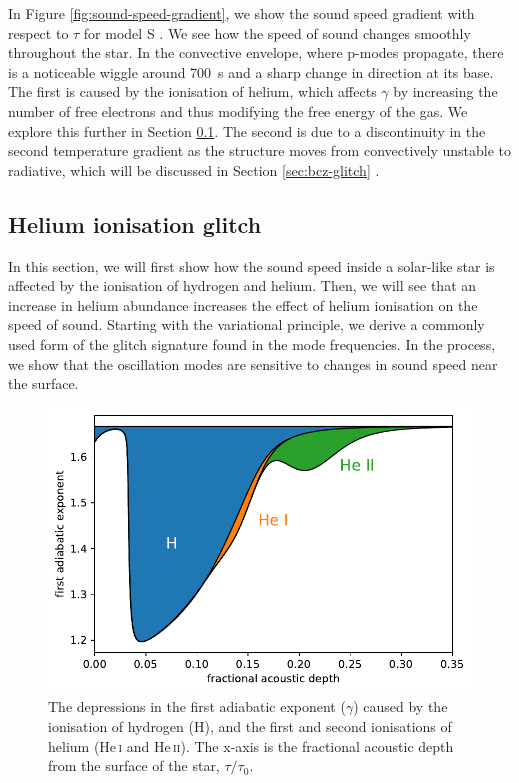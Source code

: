 In Figure \ref{fig:sound-speed-gradient}, we show the sound speed gradient with respect to \(\tau\) for model S . We see how the speed of sound changes smoothly throughout the star. In the convective envelope, where p-modes propagate, there is a noticeable wiggle around \SI{700}{\second} and a sharp change in direction at its base. The first is caused by the ionisation of helium, which affects \(\gamma\) by increasing the number of free electrons and thus modifying the free energy of the gas. We explore this further in Section \ref{sec:helium-glitch}. The second is due to a discontinuity in the second temperature gradient as the structure moves from convectively unstable to radiative, which will be discussed in Section \ref{sec:bcz-glitch} .

\subsection{Helium ionisation glitch}\label{sec:helium-glitch}

In this section, we will first show how the sound speed inside a solar-like star is affected by the ionisation of hydrogen and helium. Then, we will see that an increase in helium abundance increases the effect of helium ionisation on the speed of sound. Starting with the variational principle, we derive a commonly used form of the glitch signature found in the mode frequencies. In the process, we show that the oscillation modes are sensitive to changes in sound speed near the surface.

\begin{figure}[!tbp]
    \centering
    \includegraphics{figures/adiabatic-ionisation-regions.pdf}
    \caption{The depressions in the first adiabatic exponent (\(\gamma\)) caused by the ionisation of hydrogen (H), and the first and second ionisations of helium (He\,\textsc{i} and He\,\textsc{ii}). The x-axis is the fractional acoustic depth from the surface of the star, \(\tau/\tau_0\).}
    \label{fig:gamma-zones}
\end{figure}

